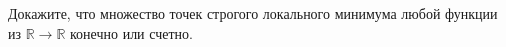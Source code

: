 Докажите, что множество точек строгого локального минимума любой функции из $\mathbb{R} \to \mathbb{R}$
конечно или счетно.

